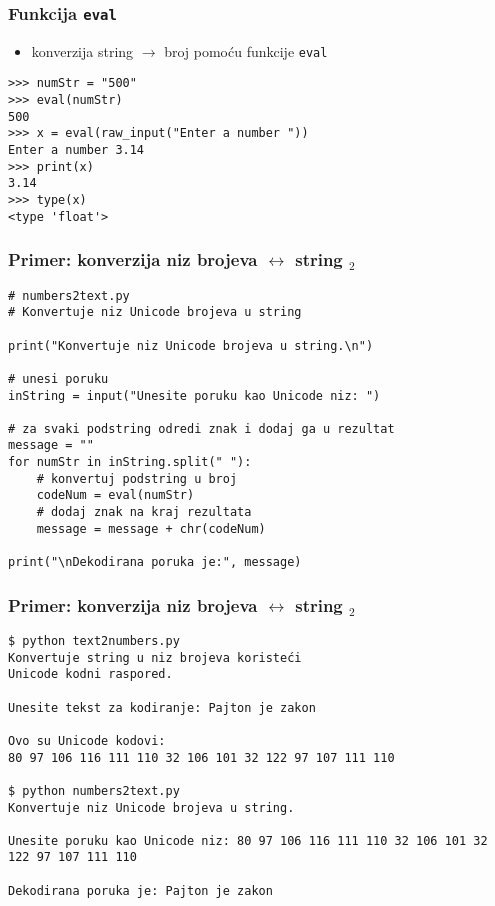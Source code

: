 \documentclass[utf8,compress]{beamer}
\begin{document}
\begin{frame}[fragile]
  \frametitle{Funkcija \texttt{eval}}
  \begin{itemize}
    \item konverzija string $\rightarrow$ broj pomoću funkcije \texttt{eval}
  \end{itemize}
\begin{verbatim}
>>> numStr = "500"
>>> eval(numStr)
500
>>> x = eval(raw_input("Enter a number "))
Enter a number 3.14
>>> print(x)
3.14
>>> type(x)
<type 'float'>
\end{verbatim}
\end{frame}

\begin{frame}[fragile,shrink=10]
  \frametitle{Primer: konverzija niz brojeva $\leftrightarrow$ string $_2$}
\begin{verbatim}
# numbers2text.py
# Konvertuje niz Unicode brojeva u string

print("Konvertuje niz Unicode brojeva u string.\n")

# unesi poruku
inString = input("Unesite poruku kao Unicode niz: ")

# za svaki podstring odredi znak i dodaj ga u rezultat
message = ""
for numStr in inString.split(" "):
    # konvertuj podstring u broj
    codeNum = eval(numStr)
    # dodaj znak na kraj rezultata
    message = message + chr(codeNum) 

print("\nDekodirana poruka je:", message)
\end{verbatim}
\end{frame}

\begin{frame}[fragile,shrink=10]
  \frametitle{Primer: konverzija niz brojeva $\leftrightarrow$ string $_2$}
\begin{verbatim}
$ python text2numbers.py
Konvertuje string u niz brojeva koristeći
Unicode kodni raspored.

Unesite tekst za kodiranje: Pajton je zakon

Ovo su Unicode kodovi:
80 97 106 116 111 110 32 106 101 32 122 97 107 111 110

$ python numbers2text.py
Konvertuje niz Unicode brojeva u string.

Unesite poruku kao Unicode niz: 80 97 106 116 111 110 32 106 101 32 122 97 107 111 110

Dekodirana poruka je: Pajton je zakon
\end{verbatim}
\end{frame}
\end{document}
